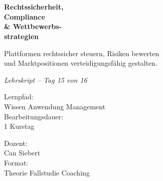 \documentclass[11pt,a4paper,oneside]{article}
\newcommand{\caveatfontfallback}{\itshape}
\newcommand\caveatfont{\caveatfontfallback}%
\begin{document}
\begin{titlepage}
  \pagestyle{empty}
  \vspace*{1.5cm}
  \\[2pt]
  \noindent{\color{lpAccent}\rule{\linewidth}{1.2pt}}\\[4pt]

  \vspace{3cm}
  {\sffamily\fontsize{30}{34}\selectfont\bfseries\color{lpInk}Rechtssicherheit,\\Compliance\\\& Wettbewerbs-\\strategien\par}

  \vspace{0.7cm}
  {\sffamily\large\color{lpGray}Plattformen rechtssicher steuern, Risiken bewerten\\und Marktpositionen verteidigungsfähig gestalten.\par}

  \vspace{1.5cm}
  {\caveatfont\LARGE\color{lpAmber}Lehrskript -- Tag 15 von 16}\par

  \vfill

  \noindent\begin{minipage}{0.55\linewidth}
    {\sffamily\footnotesize\color{lpGray}Lernpfad:}\\
    {\sffamily\small\color{lpInk}Wissen \textrightarrow{} Anwendung \textrightarrow{} Management}\\[10pt]
    {\sffamily\footnotesize\color{lpGray}Bearbeitungsdauer:}\\
    {\sffamily\small\color{lpInk}1 Kurstag}
  \end{minipage}\hfill
  \begin{minipage}{0.4\linewidth}
    \raggedleft
    {\sffamily\footnotesize\color{lpGray}Dozent:}\\
    {\sffamily\small\color{lpInk}Can Siebert}\\[10pt]
    {\sffamily\footnotesize\color{lpGray}Format:}\\
    {\sffamily\small\color{lpInk}Theorie \textperiodcentered{} Fallstudie \textperiodcentered{} Coaching}
  \end{minipage}

  \vspace{0.5cm}
  \noindent{\color{lpAccent}\rule{\linewidth}{0.6pt}}
\end{titlepage}
\end{document}
